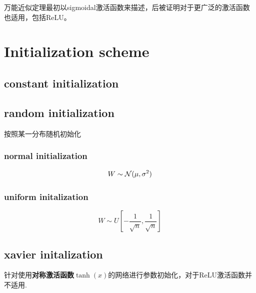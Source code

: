 万能近似定理最初以sigmoidal激活函数来描述，后被证明对于更广泛的激活函数也适用\cite{Leshno1993}，包括ReLU。

\section{Initialization scheme}
\subsection{constant initialization}

\subsection{random initialization}
按照某一分布随机初始化
\subsubsection{normal initialization}
\begin{equation}
    W \sim \mathcal{N}(\mu, \sigma^2)
\end{equation}

\subsubsection{uniform initalization}
\begin{equation}
    W \sim U[-\frac{1}{\sqrt{n}}, \frac{1}{\sqrt{n}}]
\end{equation}

\subsection{xavier initalization}
针对使用\textbf{对称激活函数}$\tanh(x)$的网络进行参数初始化，对于ReLU激活函数并不适用\cite{Glorot2010}.

